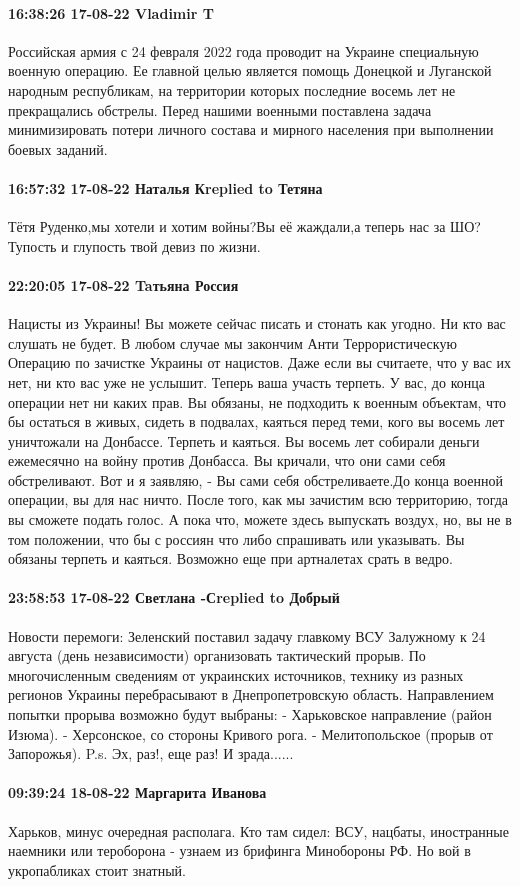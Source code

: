 \paragraph{16:38:26 17-08-22 Vladimir T}

Российская армия с 24 февраля 2022 года проводит на Украине специальную военную
операцию. Ее главной целью является помощь Донецкой и Луганской народным
республикам, на территории которых последние восемь лет не прекращались
обстрелы. Перед нашими военными поставлена задача минимизировать потери личного
состава и мирного населения при выполнении боевых заданий.

\paragraph{16:57:32 17-08-22 Наталья Кreplied to Тетяна}

Тётя Руденко,мы хотели и хотим войны?Вы её жаждали,а теперь нас за ШО?  Тупость
и глупость твой девиз по жизни.

\paragraph{22:20:05 17-08-22 Taтьяна Россия}

Нацисты из Украины! Вы можете сейчас писать и стонать как угодно. Ни кто вас
слушать не будет. В любом случае мы закончим Анти Террористическую Операцию по
зачистке Украины от нацистов. Даже если вы считаете, что у вас их нет, ни кто
вас уже не услышит. Теперь ваша участь терпеть. У вас, до конца операции нет ни
каких прав. Вы обязаны, не подходить к военным объектам, что бы остаться в
живых, сидеть в подвалах, каяться перед теми, кого вы восемь лет уничтожали на
Донбассе. Терпеть и каяться. Вы восемь лет собирали деньги ежемесячно на войну
против Донбасса. Вы кричали, что они сами себя обстреливают. Вот и я заявляю, -
Вы сами себя обстреливаете.До конца военной операции, вы для нас ничто. После
того, как мы зачистим всю территорию, тогда вы сможете подать голос. А пока
что, можете здесь выпускать воздух, но, вы не в том положении, что бы с россиян
что либо спрашивать или указывать. Вы обязаны терпеть и каяться. Возможно еще
при артналетах срать в ведро.

\paragraph{23:58:53 17-08-22 Светлана -Сreplied to Добрый}

Новости перемоги:
Зеленский поставил задачу главкому ВСУ Залужному к 24 августа (день независимости) организовать тактический прорыв.
По многочисленным сведениям от украинских источников, технику из разных регионов Украины перебрасывают в Днепропетровскую область. Направлением попытки прорыва возможно будут выбраны:
- Харьковское направление (район Изюма).
- Херсонское, со стороны Кривого рога.
- Мелитопольское (прорыв от Запорожья).
P.s. Эх, раз!, еще раз! И зрада......

\paragraph{09:39:24 18-08-22 Маргарита Иванова}

Харьков, минус очередная располага. Кто там сидел: ВСУ, нацбаты, иностранные
наемники или тероборона - узнаем из брифинга Минобороны РФ. Но вой в
укропабликах стоит знатный.

